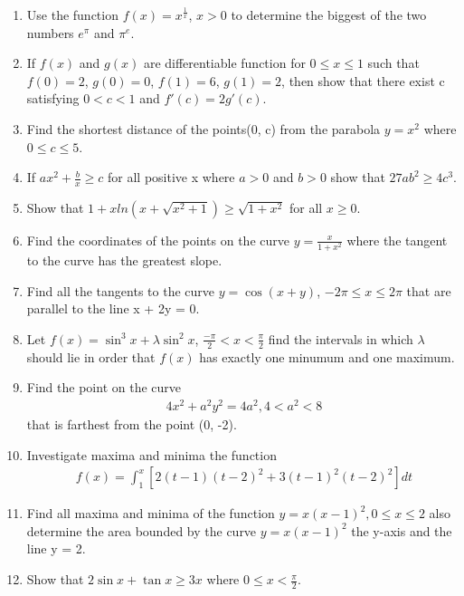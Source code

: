 \begin{enumerate}[label=\arabic*.,ref=\thesubsection.\theenumi]
\item Use the function $f(x) = x^\frac{1}{x}$, $x > 0$ to determine the biggest of the two numbers $e^{\pi}$ and $\pi^e$.

\item If $f(x)$ and $g(x)$ are differentiable function for $0 \leq x \leq 1$ such that $f(0)=2$, $g(0) = 0$, $f(1) = 6$, $g(1) = 2$, then show that there exist c satisfying $0 < c < 1$ and $f'(c) = 2g'(c)$.

\item Find the shortest distance of the points(0, c) from the parabola $y = x^2$ where $0 \leq c \leq 5$.

\item If $ax^2 + \frac{b}{x} \geq c$ for all positive x where $a > 0$ and $b > 0$ show that $27ab^2 \geq 4c^3$.

\item Show that $1 + xln(x + \sqrt{x^2 + 1}) \geq \sqrt{1 + x^2}$ for all $x \geq 0$.

\item Find the coordinates of the points on the curve $y = \frac{x}{1 + x^2}$ where the tangent to the curve has the greatest slope.

\item Find all the tangents to the curve $y = \cos(x + y)$, $-2\pi \leq x \leq 2\pi$ that are parallel to the line 
x + 2y = 0.

\item Let $f(x) = \sin^3 x + \lambda \sin^2 x$, $\frac{-\pi}{2} < x < \frac{\pi}{2}$ find the intervals in which 
$\lambda$ should lie in order that $f(x)$ has exactly one minumum and one maximum.

\item Find the point on the curve 
\begin{align*}
4x^2 + a^2y^2 = 4a^2, 4 < a^2 < 8 
\end{align*}
that is farthest from the point (0, -2).

\item Investigate maxima and minima the function
\begin{align*}
f(x) = \int_{1}^{x}[2(t - 1)(t - 2)^2 + 3(t - 1)^2(t - 2)^2]dt
\end{align*}

\item Find all maxima and minima of the function $y = x(x - 1)^2, 0 \leq x \leq 2$ also determine the area bounded by the curve $y = x(x - 1)^2$ the y-axis and the line y = 2.

\item Show that $2\sin x + \tan x \geq 3x$ where $0 \leq x < \frac{\pi}{2}$.


\end{enumerate}
